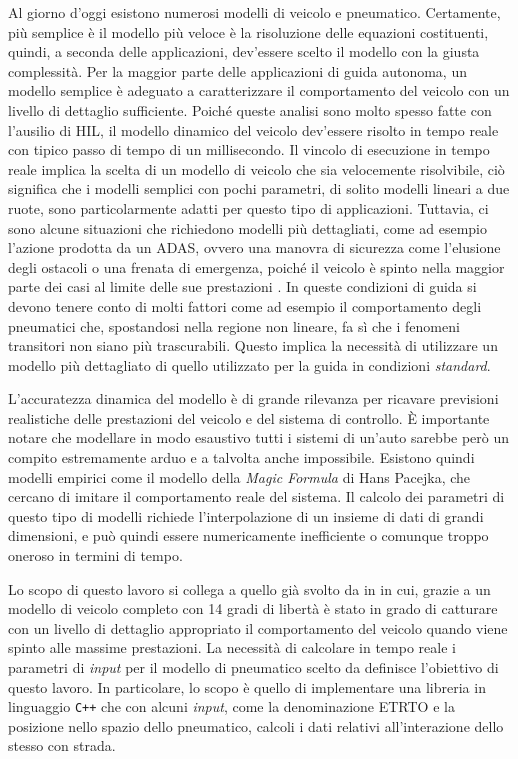 Al giorno d'oggi esistono numerosi modelli di veicolo e pneumatico. Certamente, più semplice è il modello più veloce è la risoluzione delle equazioni costituenti, quindi, a seconda delle applicazioni, dev'essere scelto il modello con la giusta complessità. Per la maggior parte delle applicazioni di guida autonoma, un modello semplice è adeguato a caratterizzare il comportamento del veicolo con un livello di dettaglio sufficiente. Poiché queste analisi sono molto spesso fatte con l'ausilio di \ac{HIL}, il modello dinamico del veicolo dev'essere risolto in tempo reale con tipico passo di tempo di un millisecondo. Il vincolo di esecuzione in tempo reale implica la scelta di un modello di veicolo che sia velocemente risolvibile, ciò significa che i modelli semplici con pochi parametri, di solito modelli lineari a due ruote, sono particolarmente adatti per questo tipo di applicazioni. Tuttavia, ci sono alcune situazioni che richiedono modelli più dettagliati, come ad esempio l'azione prodotta da un \ac{ADAS}, ovvero una manovra di sicurezza come l'elusione degli ostacoli o una frenata di emergenza, poiché il veicolo è spinto nella maggior parte dei casi al limite delle sue prestazioni \cite{impacts}. In queste condizioni di guida si devono tenere conto di molti fattori come ad esempio il comportamento degli pneumatici che, spostandosi nella regione non lineare, fa sì che i fenomeni transitori non siano più trascurabili. Questo implica la necessità di utilizzare un modello più dettagliato di quello utilizzato per la guida in condizioni \textit{standard}.

L'accuratezza dinamica del modello è di grande rilevanza per ricavare previsioni realistiche delle prestazioni del veicolo e del sistema di controllo. È importante notare che modellare in modo esaustivo tutti i sistemi di un'auto sarebbe però un compito estremamente arduo e a talvolta anche impossibile. Esistono quindi modelli empirici come il modello della \textit{Magic Formula} di Hans Pacejka, che cercano di imitare il comportamento reale del sistema. Il calcolo dei parametri di questo tipo di modelli richiede l'interpolazione di un insieme di dati di grandi dimensioni, e può quindi essere numericamente inefficiente o comunque troppo oneroso in termini di tempo.

Lo scopo di questo lavoro si collega a quello già svolto da \citeauthor{Larcher} in \cite{Larcher} in cui, grazie a un modello di veicolo completo con 14 gradi di libertà è stato in grado di catturare con un livello di dettaglio appropriato il comportamento del veicolo quando viene spinto alle massime prestazioni. La necessità di calcolare in tempo reale i parametri di \textit{input} per il modello di pneumatico scelto da \cite{Larcher} definisce l'obiettivo di questo lavoro. In particolare, lo scopo è quello di implementare una libreria in linguaggio \texttt{C++} che con alcuni \textit{input}, come la denominazione \ac{ETRTO} e la posizione nello spazio dello pneumatico, calcoli i dati relativi all'interazione dello stesso con strada.